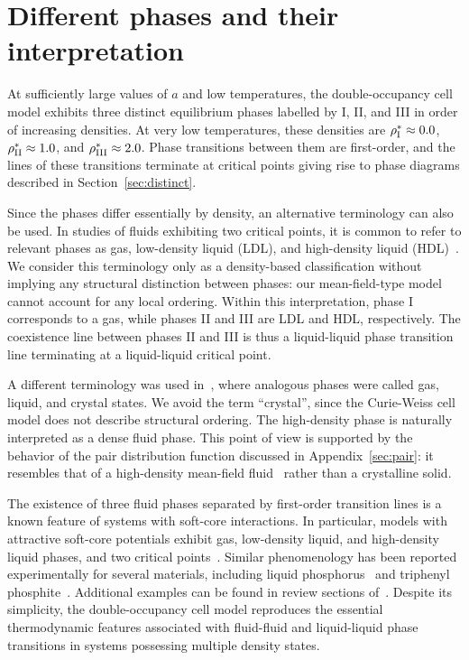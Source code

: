 \documentclass[pdflatex,sn-mathphys-num]{sn-jnl}%
\theoremstyle{thmstyleone}%
\theoremstyle{thmstyletwo}%
\theoremstyle{thmstylethree}%
\begin{document}
	
	\section{Different phases and their interpretation}
	At sufficiently large values of $a$ and low temperatures, the double-occupancy cell model exhibits three distinct equilibrium phases labelled by I, II, and III in order of increasing densities. At very low temperatures, these densities are $\rho^{*}_{\rm I} \approx 0.0$, $\rho^*_{\rm II} \approx 1.0$, and $\rho^*_{\rm III} \approx 2.0$. Phase transitions between them are first-order, and the lines of these transitions terminate at critical points giving rise to phase diagrams described in Section~\ref{sec:distinct}.

	Since the phases differ essentially by density, an alternative terminology can also be used. In studies of fluids exhibiting two critical points, it is common to refer to relevant phases as gas, low-density liquid (LDL), and high-density liquid (HDL)~\cite{Franzese07}.
	We consider this terminology only as a density-based classification without implying any structural distinction between phases: our mean-field-type model cannot account for any local ordering.
	Within this interpretation, phase I corresponds to a gas, while phases II and III are LDL and HDL, respectively.
	The coexistence line between phases II and III is thus a liquid-liquid phase transition line terminating at a liquid-liquid critical point.
	
	A different terminology was used in~\cite{LYZ21}, where analogous phases were called gas, liquid, and crystal states. We avoid the term ``crystal'', since the Curie-Weiss cell model does not describe structural ordering. The high-density phase is naturally interpreted as a dense fluid phase. This point of view is supported by the behavior of the pair distribution function discussed in Appendix~\ref{sec:pair}: it resembles that of a high-density mean-field fluid~\cite{LBH00} rather than a crystalline solid.
	
	The existence of three fluid phases separated by first-order transition lines is a known feature of systems with soft-core interactions. In particular, models with attractive soft-core potentials exhibit gas, low-density liquid, and high-density liquid phases, and two critical points~\cite{Franzese07}. Similar phenomenology has been reported experimentally for several materials, including liquid phosphorus~\cite{KMUetal00,MFCM03,YKP21} and triphenyl phosphite~\cite{KT04}. Additional examples can be found in review sections of~\cite{dONCB06,Franzese07}. Despite its simplicity, the double-occupancy cell model reproduces the essential thermodynamic features associated with fluid-fluid and liquid-liquid phase transitions in systems possessing multiple density states.
	
\end{document}
